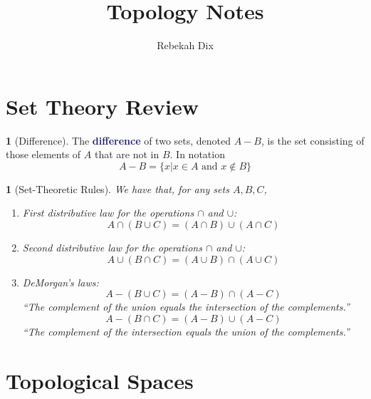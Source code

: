 \documentclass[12pt]{article}
\title{Topology Notes}
\author{Rebekah Dix}
\newcommand{\navy}[1]{\textcolor{MidnightBlue}{\bf #1}}
\theoremstyle{plain}
\newtheorem{theorem}{\color{ForestGreen}{\textbf{Theorem}}}[section]
\theoremstyle{definition}
\newtheorem{definition}{\color{MidnightBlue}{\textbf{Definition}}}[section]
\newcommand{\1}{\mathbbm 1}
\begin{document}
\maketitle
\tableofcontents
\newpage 

\section{Set Theory Review}

\begin{definition}[Difference]
	The \navy{difference} of two sets, denoted $A-B$, is the set consisting of those elements of $A$ that are not in $B$. In notation
	\begin{equation*}
		A - B = \{x | x \in A \text{ and } x \not\in B\}	
	\end{equation*}
\end{definition}

\begin{theorem}[Set-Theoretic Rules]
	We have that, for any sets $A, B, C$,
	\begin{enumerate}
		\item First distributive law for the operations $\cap$ and $\cup$:
		\begin{equation}
			A \cap (B \cup C) = (A \cap B) \cup (A \cap C)
		\end{equation}
		\item Second distributive law for the operations $\cap$ and $\cup$:
		\begin{equation}
			A \cup (B \cap C) = (A \cup B) \cap (A \cup C)
		\end{equation}
		\item DeMorgan's laws:
		\begin{equation}
			A - (B \cup C) = (A - B) \cap (A - C)
		\end{equation}
		``The complement of the union equals the intersection of the complements.''
		\begin{equation}
			A - (B \cap C) = (A - B) \cup (A - C)
		\end{equation}
		``The complement of the intersection equals the union of the complements.''
	\end{enumerate}
\end{theorem}


\section{Topological Spaces}
\end{document}

